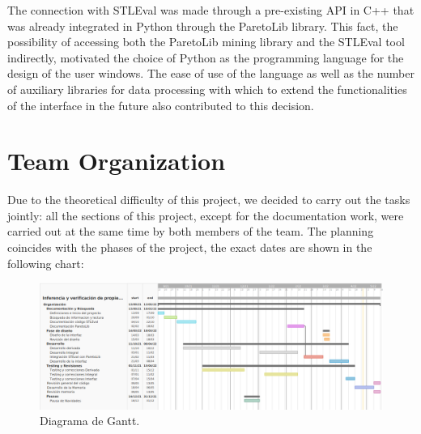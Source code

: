 The connection with STLEval was made through a pre-existing API in C++ that was already integrated in Python through the ParetoLib library. This fact, the possibility of accessing both the ParetoLib mining library and the STLEval tool indirectly, motivated the choice of Python as the programming language for the design of the user windows. The ease of use of the language as well as the number of auxiliary libraries for data processing with which to extend the functionalities of the interface in the future also contributed to this decision.

\section{Team Organization}
Due to the theoretical difficulty of this project, we decided to carry out the tasks jointly: all the sections of this project, except for the documentation work, were carried out at the same time by both members of the team.
The planning coincides with the phases of the project, the exact dates are shown in the following chart:

\begin{figure}
\centering
  \includegraphics[width=.8\linewidth ,angle = 90,scale = 1]{images/gant}
\caption{Diagrama de Gantt.}
\label{fig:gant2}
\end{figure}